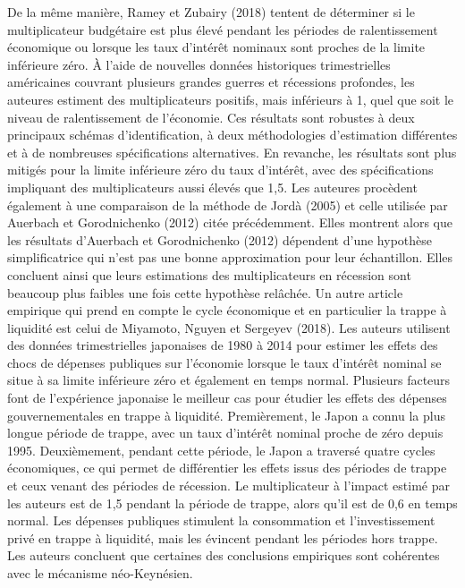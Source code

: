 \documentclass[12pt,letterpaper]{article}
\begin{document}
De la même manière, Ramey et Zubairy (2018) tentent de déterminer si le multiplicateur budgétaire est plus élevé pendant les périodes de ralentissement économique ou lorsque les taux d'intérêt nominaux sont proches de la limite inférieure zéro. À l'aide de nouvelles données historiques trimestrielles américaines couvrant plusieurs grandes guerres et récessions profondes, les auteures estiment des multiplicateurs positifs, mais inférieurs à 1, quel que soit le niveau de ralentissement de l'économie. Ces résultats sont robustes à deux principaux schémas d'identification, à deux méthodologies d'estimation différentes et à de nombreuses spécifications alternatives. En revanche, les résultats sont plus mitigés pour la limite inférieure zéro du taux d’intérêt, avec des spécifications impliquant des multiplicateurs aussi élevés que 1,5. Les auteures procèdent également à une comparaison de la méthode de Jordà (2005) et celle utilisée par Auerbach et Gorodnichenko (2012) citée précédemment. Elles montrent alors que les résultats d’Auerbach et Gorodnichenko (2012) dépendent d'une hypothèse simplificatrice qui n'est pas une bonne approximation pour leur échantillon. Elles concluent ainsi que leurs estimations des multiplicateurs en récession sont beaucoup plus faibles une fois cette hypothèse relâchée. Un autre article empirique qui prend en compte le cycle économique et en particulier la trappe à liquidité est celui de Miyamoto, Nguyen et Sergeyev (2018). Les auteurs utilisent des données trimestrielles japonaises de 1980 à 2014 pour estimer les effets des chocs de dépenses publiques sur l'économie lorsque le taux d'intérêt nominal se situe à sa limite inférieure zéro et également en temps normal. Plusieurs facteurs font de l'expérience japonaise le meilleur cas pour étudier les effets des dépenses gouvernementales en trappe à liquidité. Premièrement, le Japon a connu la plus longue période de trappe, avec un taux d'intérêt nominal proche de zéro depuis 1995. Deuxièmement, pendant cette période, le Japon a traversé quatre cycles économiques, ce qui permet de différentier les effets issus des périodes de trappe et ceux venant des périodes de récession. Le multiplicateur à l’impact estimé par les auteurs est de 1,5 pendant la période de trappe, alors qu’il est de 0,6 en temps normal. Les dépenses publiques stimulent la consommation et l’investissement privé en trappe à liquidité, mais les évincent pendant les périodes hors trappe. Les auteurs concluent que certaines des conclusions empiriques sont cohérentes avec le mécanisme néo-Keynésien.
\end{document}

